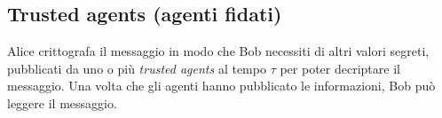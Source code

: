 
\subsection{Trusted agents (agenti fidati)}
\label{subsec:trusted-agents}
Alice crittografa il messaggio in modo che Bob necessiti di altri valori segreti,
pubblicati da uno o più \textit{trusted agents} al tempo $ \tau $ per poter
decriptare il messaggio. Una volta che gli agenti hanno pubblicato le informazioni,
Bob può leggere il messaggio.